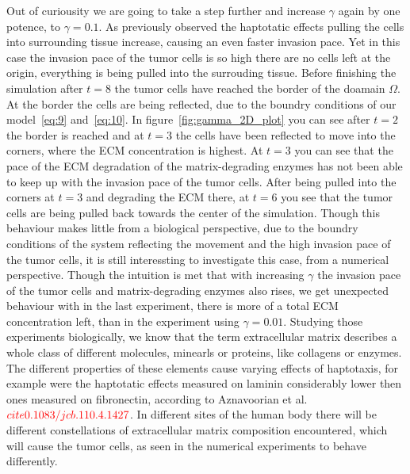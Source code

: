 Out of curiousity we are going to take a step further and increase $\gamma$ again by one potence, to $\gamma=0.1$. As previously observed the haptotatic effects pulling the cells into surrounding tissue increase, causing an even faster invasion pace. Yet in this case the invasion pace of the tumor cells is so high there are no cells left at the origin, everything is being pulled into the surrouding tissue. Before finishing the simulation after $t=8$ the tumor cells have reached the border of the doamain $\Omega$. At the border the cells are being reflected, due to the boundry conditions of our model~\ref{eq:9} and~\ref{eq:10}. In figure~\ref{fig:gamma_2D_plot} you can see after $t=2$ the border is reached and at $t=3$ the cells have been reflected to move into the corners, where the ECM concentration is highest. At $t=3$ you can see that the pace of the ECM degradation of the matrix-degrading enzymes has not been able to keep up with the invasion pace of the tumor cells. After being pulled into the corners at $t=3$ and degrading the ECM there, at $t=6$ you see that the tumor cells are being pulled back towards the center of the simulation.\newline
Though this behaviour makes little from a biological perspective, due to the boundry conditions of the system reflecting the movement and the high invasion pace of the tumor cells, it is still interessting to investigate this case, from a numerical perspective.\newline
Though the intuition is met that with increasing $\gamma$ the invasion pace of the tumor cells and matrix-degrading enzymes also rises, we get unexpected behaviour with in the last experiment, there is more of a total ECM concentration left, than in the experiment using $\gamma=0.01$.
Studying those experiments biologically, we know that the term extracellular matrix describes a whole class of different molecules, minearls or proteins, like collagens or enzymes. The different properties of these elements cause varying effects of haptotaxis, for example were the haptotatic effects measured on laminin considerably lower then ones measured on fibronectin, according to Aznavoorian et al.$\textcolor{red}{cite0.1083/jcb.110.4.1427}$. In different sites of the human body there will be different constellations of extracellular matrix composition encountered, which will cause the tumor cells, as seen in the numerical experiments to behave differently.

